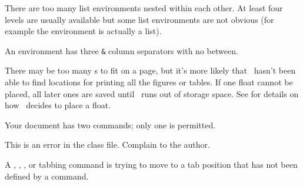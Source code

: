\begin{plainlist}
\item[] 

    There are too many list environments nested within each other. At least
four levels are usually available but some list environments are not obvious
(for example the  environment is actually a list).

\item[]

    An  environment has three \texttt{\&} column separators
with no \cmd{\\} between.


\item[]

    There may be too many \cmd{\marginpar}s to fit on a page, but it's more
likely that \ltx\ hasn't been able to find locations for printing all the
figures or tables. If one float cannot be placed, all later ones are saved 
until \ltx\ runs out of storage space. See  for 
details on how \ltx\ decides to place a float.

\item[]

    Your document has two \cmd{\documentclass} commands; only one is
permitted.


\item[]

    This is an error in the class file. Complain to the author.



\item[]

    A \cmd{\>}, \cmd{\+}, \cmd{\-}, or \cmd{\<} tabbing command
is trying to move to a tab position that has not been defined by a 
\cmd{\=} command.


\end{plainlist}
